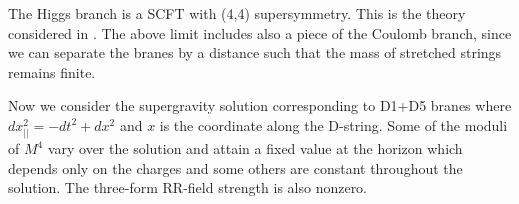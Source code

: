 The Higgs branch 
is a SCFT with (4,4) supersymmetry. This is the theory considered in \ascv .
The above limit includes also a piece of the  Coulomb branch, 
since we can separate the branes by a distance such that the
mass of stretched strings remains finite. 

Now we consider the  supergravity solution corresponding
to D1+D5 branes \hms
\eqn{}
where 
$dx_{||}^2 = -dt^2 + dx^2$ and  $x$ is the coordinate along the
D-string. Some of the  moduli of $M^4$ vary over the solution 
and attain a fixed value at the horizon which depends only on
the charges and some others are constant throughout the solution.
The three-form RR-field strength is also nonzero.

%

